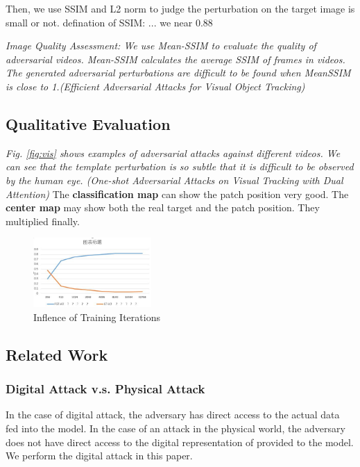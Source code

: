 \documentclass{article}
\begin{document}
Then, we use SSIM and L2 norm to judge the perturbation on the target image is small or not. 
defination of SSIM: ... we near 0.88

\textit{Image Quality Assessment: We use Mean-SSIM to evaluate the quality of adversarial videos. Mean-SSIM calculates the average SSIM of frames in videos. The generated adversarial perturbations are difficult to be found when MeanSSIM is close to 1.(Efficient Adversarial Attacks for Visual Object Tracking)}

\subsection{Qualitative Evaluation}

\textit{Fig. \ref{fig:vis} shows examples of adversarial attacks against different videos. We can see that the template perturbation is so subtle that it is difficult to be observed by the human eye. (One-shot Adversarial Attacks on Visual Tracking with Dual Attention)} The \textbf{classification map} can show the patch position very good. The \textbf{center map} may show both the real target and the patch position. They multiplied finally.

\begin{figure}[ht]
\centering
\includegraphics[width=0.4\textwidth]{images/iter.jpg}
\caption{Inflence of Training Iterations}
\end{figure}

\subsection{Related Work}

\subsubsection{Digital Attack v.s. Physical Attack}

In the case of digital attack, the adversary has direct access to the actual data fed into the model. In the case of an attack in the physical world, the adversary does not have direct access to the digital representation of provided to the model. We perform the digital attack in this paper.
\end{document}
